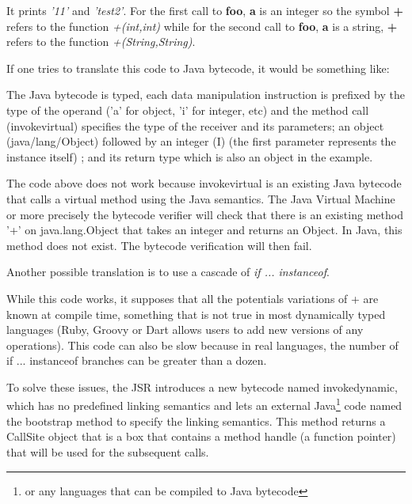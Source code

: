 \documentclass{sig-alternate}
\def \Jsr{JSR\xspace}
\begin{document}
      

      It prints {\it '11'} and {\it 'test2'}.
      For the first call to {\bf foo}, {\bf a} is an integer so the symbol {\bf +} refers
      to the function {\it +(int,int)} while for the second call to {\bf foo}, {\bf a} is a string, {\bf +} refers to the function {\it +(String,String)}.

      If one tries to translate this code to Java bytecode, it would be something like:

      

      The Java bytecode is typed, each data manipulation instruction is prefixed 
      by the type of the operand ('a' for object, 'i' for integer, etc)
      and the method call (invokevirtual) specifies the type of the receiver and its parameters;
      an object (java/lang/Object) followed by an integer (I) (the first parameter represents the instance itself) ; and its return type
      which is also an object in the example.

      The code above does not work because invokevirtual is an existing Java bytecode that calls a virtual method using the Java semantics.
      The Java Virtual Machine or more precisely the bytecode verifier will check that
      there is an existing method '+' on java.lang.Object that takes an integer and returns an Object.
      In Java, this method does not exist. The bytecode verification will then fail.

      Another possible translation is to use a cascade of \emph{if ... instanceof}.

      \vspace{1em}

      

      While this code works, it supposes that all the potentials variations of + are known at compile time,
      something that is not true in most dynamically typed languages (Ruby, Groovy or Dart allows users to add
      new versions of any operations).
      This code can also be slow because in real languages, the number of if ... instanceof branches
      can be greater than a dozen. 

      To solve these issues, the \Jsr introduces a new bytecode named invokedynamic, which has no predefined
      linking semantics and lets an external Java\footnote{or any languages that can be compiled to Java bytecode} code
      named the bootstrap method to specify the linking semantics.
      This method returns a CallSite object that is a box that contains a method handle (a function pointer)
      that will be used for the subsequent calls.
\end{document}
